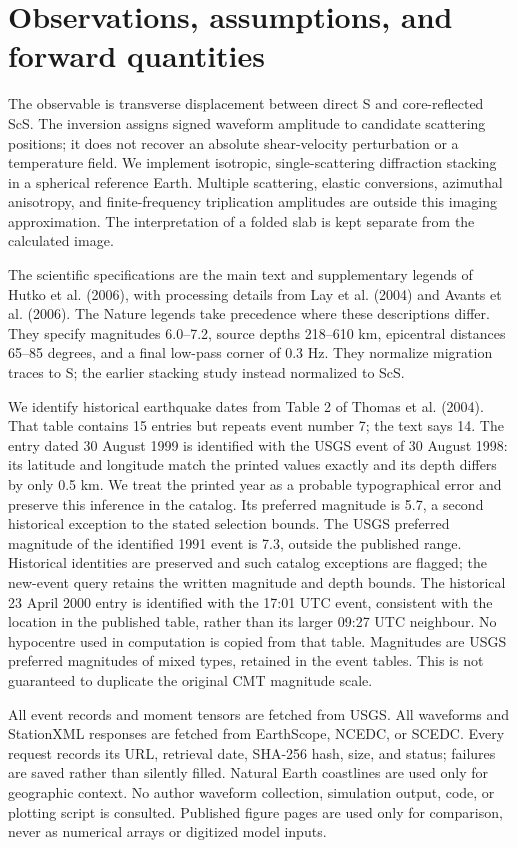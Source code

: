 \section{Observations, assumptions, and forward quantities}
The observable is transverse displacement between direct S and core-reflected ScS.
The inversion assigns signed waveform amplitude to candidate scattering positions;
it does not recover an absolute shear-velocity perturbation or a temperature field.
We implement isotropic, single-scattering diffraction stacking in a spherical
reference Earth. Multiple scattering, elastic conversions, azimuthal anisotropy,
and finite-frequency triplication amplitudes are outside this imaging approximation.
The interpretation of a folded slab is kept separate from the calculated image.

The scientific specifications are the main text and supplementary legends of
Hutko et al. (2006), with processing details from Lay et al. (2004) and Avants
et al. (2006). The Nature legends take precedence where these descriptions differ.
They specify magnitudes 6.0--7.2, source depths 218--610 km, epicentral distances
65--85 degrees, and a final low-pass corner of 0.3 Hz. They normalize migration
traces to S; the earlier stacking study instead normalized to ScS.

We identify historical earthquake dates from Table 2 of Thomas et al. (2004).
That table contains 15 entries but repeats event number 7; the text says 14.
The entry dated 30 August 1999 is identified with the USGS event of 30 August
1998: its latitude and longitude match the printed values exactly and its depth
differs by only 0.5 km. We treat the printed year as a probable typographical
error and preserve this inference in the catalog. Its preferred magnitude is
5.7, a second historical exception to the stated selection bounds. The USGS
preferred magnitude of the identified 1991 event is 7.3, outside the published
range. Historical identities are preserved and such catalog exceptions are
flagged; the new-event query retains the written magnitude and depth bounds.
The historical 23 April 2000 entry is identified with the 17:01 UTC event,
consistent with the location in the published table, rather than its larger
09:27 UTC neighbour. No hypocentre used in computation is copied from that table.
Magnitudes are USGS preferred magnitudes of mixed types, retained in the event
tables. This is not guaranteed to duplicate the original CMT magnitude scale.

All event records and moment tensors are fetched from USGS. All waveforms and
StationXML responses are fetched from EarthScope, NCEDC, or SCEDC. Every request
records its URL, retrieval date, SHA-256 hash, size, and status; failures are saved
rather than silently filled. Natural Earth coastlines are used only for geographic
context. No author waveform collection, simulation output, code, or plotting
script is consulted. Published figure pages are used only for comparison, never
as numerical arrays or digitized model inputs.

